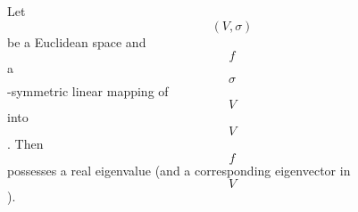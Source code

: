 Let $$(V, \sigma)$$ be a Euclidean space and $$f$$ a $$\sigma$$-symmetric linear mapping of $$V$$ into $$V$$. Then $$f$$ possesses a real eigenvalue (and a corresponding eigenvector in $$V$$).
